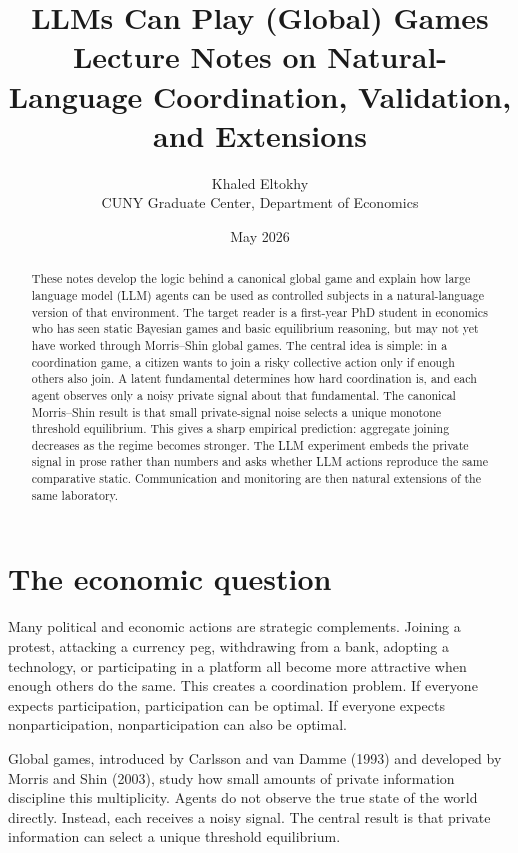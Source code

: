 \documentclass[11pt]{article}
\title{\textbf{LLMs Can Play (Global) Games}\\[0.3em]
\large Lecture Notes on Natural-Language Coordination, Validation, and Extensions}
\author{Khaled Eltokhy\\CUNY Graduate Center, Department of Economics}
\date{May 2026}
\begin{document}
\maketitle

\begin{abstract}
These notes develop the logic behind a canonical global game and explain how large language model (LLM) agents can be used as controlled subjects in a natural-language version of that environment. The target reader is a first-year PhD student in economics who has seen static Bayesian games and basic equilibrium reasoning, but may not yet have worked through Morris--Shin global games. The central idea is simple: in a coordination game, a citizen wants to join a risky collective action only if enough others also join. A latent fundamental determines how hard coordination is, and each agent observes only a noisy private signal about that fundamental. The canonical Morris--Shin result is that small private-signal noise selects a unique monotone threshold equilibrium. This gives a sharp empirical prediction: aggregate joining decreases as the regime becomes stronger. The LLM experiment embeds the private signal in prose rather than numbers and asks whether LLM actions reproduce the same comparative static. Communication and monitoring are then natural extensions of the same laboratory.
\end{abstract}

\tableofcontents

\section{The economic question}

Many political and economic actions are strategic complements. Joining a protest, attacking a currency peg, withdrawing from a bank, adopting a technology, or participating in a platform all become more attractive when enough others do the same. This creates a coordination problem. If everyone expects participation, participation can be optimal. If everyone expects nonparticipation, nonparticipation can also be optimal.

Global games, introduced by Carlsson and van Damme (1993) and developed by Morris and Shin (2003), study how small amounts of private information discipline this multiplicity. Agents do not observe the true state of the world directly. Instead, each receives a noisy signal. The central result is that private information can select a unique threshold equilibrium.
\end{document}
